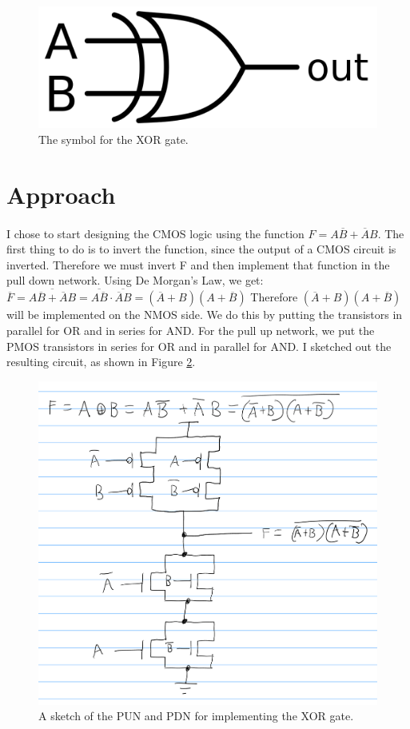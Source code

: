 \documentclass{article}
\begin{document}
  \begin{figure}[H]
    \centering
    \includegraphics[width=0.3\linewidth, frame]{images/xor-symbol.png}
    \caption{The symbol for the XOR gate.}
    \label{fig:symbol}
  \end{figure}

\section{Approach}
  \paragraph{}
  I chose to start designing the CMOS logic using the function $F=A\overline{B}+\overline{A}B$. The first thing to do is to invert the function, since the output of a CMOS circuit is inverted. Therefore we must invert F and then implement that function in the pull down network. Using De Morgan's Law, we get: $\overline{F}=\overline{A\overline{B}+\overline{A}B}=\overline{A\overline{B}}\cdot\overline{\overline{A}B}=(\overline{A}+B)(A+\overline{B})$ Therefore $(\overline{A}+B)(A+\overline{B})$ will be implemented on the NMOS side. We do this by putting the transistors in parallel for OR and in series for AND. For the pull up network, we put the PMOS transistors in series for OR and in parallel for AND. I sketched out the resulting circuit, as shown in Figure \ref{fig:sketch1}.

  \begin{figure}[H]
    \centering
    \includegraphics[width=0.7\linewidth, frame]{screenshots/schematic-sketch-1.png}
    \caption{A sketch of the PUN and PDN for implementing the XOR gate.}
    \label{fig:sketch1}
  \end{figure}
\end{document}
